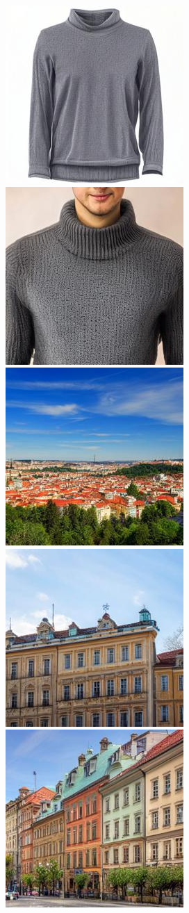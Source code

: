 \begin{figure}[h!]
\begin{subfigure}[t]{0.32\linewidth}
	\includegraphics[width=0.320\linewidth]{figs/samples_appendix_3/adjmat_cfg_2_ode_prompt_28_image_2.jpg}\;%
	\includegraphics[width=0.320\linewidth]{figs/samples_appendix_3/adjmat_cfg_2_ode_prompt_28_image_3.jpg}\\ 
	\includegraphics[width=0.320\linewidth]{figs/samples_appendix_3/adjmat_cfg_2_ode_prompt_34_image_1.jpg}\;%
	\includegraphics[width=0.320\linewidth]{figs/samples_appendix_3/adjmat_cfg_2_ode_prompt_34_image_2.jpg}\;%
	\includegraphics[width=0.320\linewidth]{figs/samples_appendix_3/adjmat_cfg_2_ode_prompt_34_image_3.jpg}\\ 

\end{subfigure}
\end{figure}
